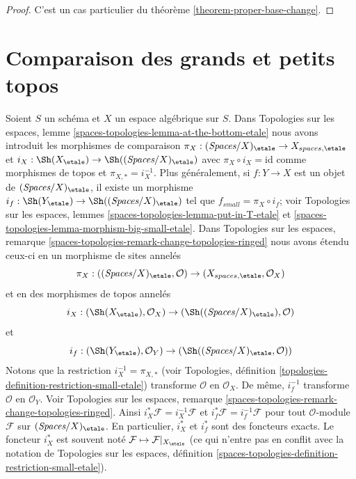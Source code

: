 \begin{proof}
C'est un cas particulier du théorème \ref{theorem-proper-base-change}.
\end{proof}










\section{Comparaison des grands et petits topos}
\label{section-compare}

\noindent
Soient $S$ un schéma et $X$ un espace algébrique sur $S$.
Dans Topologies sur les espaces, lemme
\ref{spaces-topologies-lemma-at-the-bottom-etale}
nous avons introduit les morphismes de comparaison
$\pi_X : (\textit{Spaces}/X)_\etale \to X_{spaces, \etale}$ et
$i_X : \Sh(X_\etale) \to \Sh((\textit{Spaces}/X)_\etale)$
avec $\pi_X \circ i_X = \text{id}$ comme morphismes de topos et
$\pi_{X, *} = i_X^{-1}$.
Plus généralement, si $f : Y \to X$ est un objet de $(\textit{Spaces}/X)_\etale$,
il existe un morphisme
$i_f : \Sh(Y_\etale) \to \Sh((\textit{Spaces}/X)_\etale)$
tel que $f_{small} = \pi_X \circ i_f$; voir
Topologies sur les espaces, lemmes \ref{spaces-topologies-lemma-put-in-T-etale} et
\ref{spaces-topologies-lemma-morphism-big-small-etale}. Dans
Topologies sur les espaces, remarque
\ref{spaces-topologies-remark-change-topologies-ringed}
nous avons étendu ceux-ci en un morphisme de sites annelés
$$
\pi_X :
((\textit{Spaces}/X)_\etale, \mathcal{O})
\to
(X_{spaces, \etale}, \mathcal{O}_X)
$$
et en des morphismes de topos annelés
$$
i_X :
(\Sh(X_\etale), \mathcal{O}_X)
\to
(\Sh((\textit{Spaces}/X)_\etale), \mathcal{O})
$$
et
$$
i_f :
(\Sh(Y_\etale), \mathcal{O}_Y)
\to
(\Sh((\textit{Spaces}/X)_\etale, \mathcal{O}))
$$
Notons que la restriction $i_X^{-1} = \pi_{X, *}$ (voir
Topologies, définition \ref{topologies-definition-restriction-small-etale})
transforme $\mathcal{O}$ en $\mathcal{O}_X$.
De même, $i_f^{-1}$ transforme $\mathcal{O}$ en $\mathcal{O}_Y$.
Voir Topologies sur les espaces, remarque
\ref{spaces-topologies-remark-change-topologies-ringed}.
Ainsi $i_X^*\mathcal{F} = i_X^{-1}\mathcal{F}$ et
$i_f^*\mathcal{F} = i_f^{-1}\mathcal{F}$ pour tout $\mathcal{O}$-module
$\mathcal{F}$ sur $(\textit{Spaces}/X)_\etale$. En particulier, $i_X^*$ et
$i_f^*$ sont des foncteurs exacts. Le foncteur $i_X^*$ est souvent noté
$\mathcal{F} \mapsto \mathcal{F}|_{X_\etale}$ (ce qui n'entre pas
en conflit avec la notation de Topologies sur les espaces, définition
\ref{spaces-topologies-definition-restriction-small-etale}).

